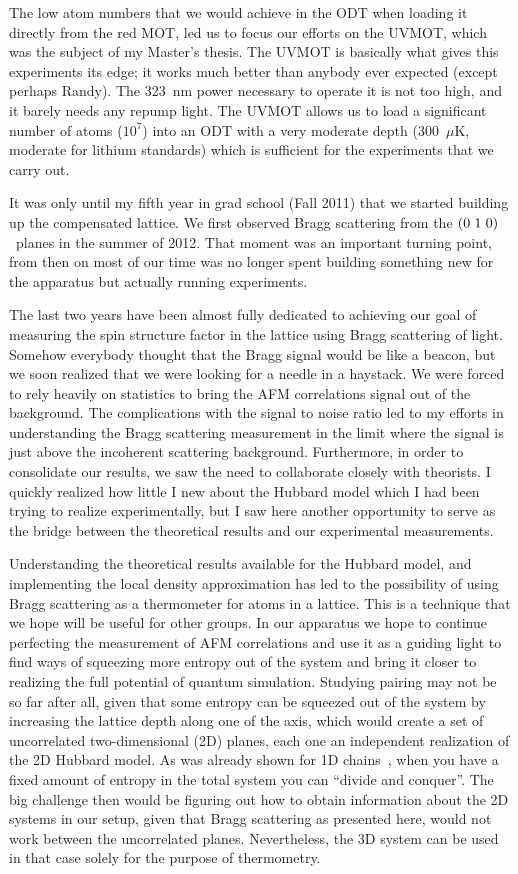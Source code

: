 \documentclass[twoside,11pt]{memoir}
\newcommand{\zoz}{\ensuremath{(0\hspace{0.3em}1\hspace{0.3em}0)}}
\begin{document}
The low atom numbers that we would achieve in the ODT when loading it directly
from the red MOT, led us to focus our efforts on the UVMOT, which was the
subject of my Master's thesis.   The UVMOT is basically what gives this
experiments its edge;  it works much better than anybody ever expected (except
perhaps Randy).  The 323~nm power necessary to operate it is not too high, and
it barely needs any repump light.  The UVMOT allows us to load a significant
number of atoms ($10^{7}$) into an ODT with a very moderate depth (300~$\mu$K,
moderate for lithium standards) which is sufficient for the experiments that we
carry out.

It was only until my fifth year in grad school (Fall 2011) that we started
building up the compensated lattice.   We first observed Bragg scattering from
the \zoz\ planes in the summer of 2012.   That moment was an important turning
point, from then on most of our time was no longer spent building something new
for the apparatus but actually running experiments. 

The last two years have been almost fully dedicated to achieving our goal of
measuring the spin structure factor in the lattice using Bragg scattering of
light.   Somehow everybody thought that the Bragg signal would be like a
beacon, but we soon realized that we were looking for a needle in a haystack.
We were forced to rely heavily on statistics to bring the AFM correlations
signal out of the background.     The complications with the signal to noise
ratio led to my efforts in understanding the Bragg scattering measurement in
the limit where the signal is just above the incoherent scattering background.
Furthermore, in order to consolidate our results, we saw the need to collaborate
closely with theorists.  I quickly realized how little I new about the Hubbard
model which I had been trying to realize experimentally, but I saw here another
opportunity to serve as the bridge between the theoretical results and our
experimental measurements.

Understanding the theoretical results available for the Hubbard model, and
implementing the local density approximation  has led to the possibility of
using Bragg scattering as a thermometer for atoms in a lattice.  This is a
technique that we hope will be useful for other groups.  In our apparatus we
hope to continue perfecting the measurement of AFM correlations and use it as a
guiding light to find ways of squeezing more entropy out of the system and
bring it closer to realizing the full potential of quantum simulation.
Studying pairing may not be so far after all, given that some entropy can be
squeezed out of the system by increasing the lattice depth along one of the
axis, which would create a set of uncorrelated two-dimensional (2D) planes,
each one an independent realization of the 2D Hubbard model.  As was already
shown for 1D chains~\cite{Greif2013}, when you have a fixed amount of entropy
in the total system you can ``divide and conquer''.   The big challenge then
would be figuring out how to obtain information about the 2D systems in our
setup, given that Bragg scattering as presented here, would not work between
the uncorrelated planes.   Nevertheless, the 3D system can be used in that case
solely for the purpose of thermometry.  
\end{document}
